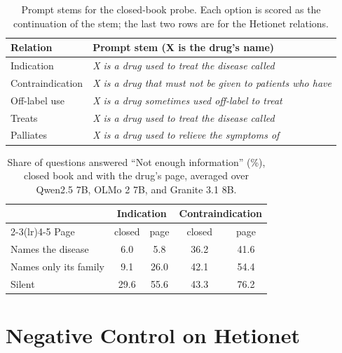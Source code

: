 \documentclass[letterpaper]{article} %
\begin{document}
\begin{table}[h]
\centering
\footnotesize
\setlength{\tabcolsep}{3pt}
\begin{tabular}{p{2.15cm}p{4.95cm}}
\toprule
Relation & Prompt stem (X is the drug's name) \\
\midrule
Indication & \textit{X is a drug used to treat the disease called} \\
Contraindication & \textit{X is a drug that must not be given to patients who have} \\
Off-label use & \textit{X is a drug sometimes used off-label to treat} \\
Treats & \textit{X is a drug used to treat the disease called} \\
Palliates & \textit{X is a drug used to relieve the symptoms of} \\
\bottomrule
\end{tabular}
\caption{Prompt stems for the closed-book probe. Each option is scored as the
continuation of the stem; the last two rows are for the Hetionet relations.}
\label{tab:stems}
\end{table}

\begin{table}[h]
\centering
\footnotesize
\setlength{\tabcolsep}{3.5pt}
\begin{tabular}{lcccc}
\toprule
 & \multicolumn{2}{c}{Indication} & \multicolumn{2}{c}{Contraindication} \\
\cmidrule(lr){2-3}\cmidrule(lr){4-5}
Page & closed & page & closed & page \\
\midrule
Names the disease & 6.0 & 5.8 & 36.2 & 41.6 \\
Names only its family & 9.1 & 26.0 & 42.1 & 54.4 \\
Silent & 29.6 & 55.6 & 43.3 & 76.2 \\
\bottomrule
\end{tabular}
\caption{Share of questions answered ``Not enough information'' (\%), closed
book and with the drug's page, averaged over Qwen2.5 7B, OLMo 2 7B, and
Granite 3.1 8B.}
\label{tab:declines}
\end{table}

\section{Negative Control on Hetionet}
\end{document}
